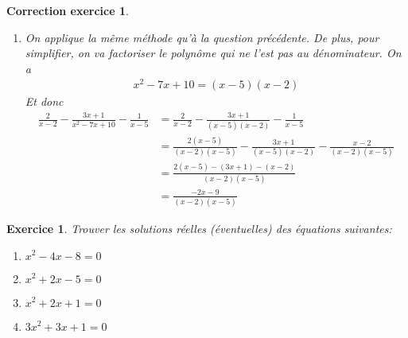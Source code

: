 \documentclass[12pt]{article}
\newtheorem{exercice}{\bf Exercice}
\newtheorem{correction}{\bf Correction exercice}
\newenvironment{exo}{
\begin{exercice}\smallskip\normalfont}{\end{exercice}
}
\newenvironment{cor}{
\begin{correction}\smallskip\normalfont}{\end{correction}
}
\newif\ifcorrige\corrigefalse
\begin{document}
\begin{cor}
\begin{enumerate}
\item On applique la m\^eme m\'ethode qu'\`a la question pr\'ec\'edente.
  De plus, pour simplifier, on va factoriser le polyn\^ome qui ne l'est pas au d\'enominateur.
  On a
  \begin{align*}
    x^2-7x+10 = (x-5)(x-2)
  \end{align*}
  Et donc
  \begin{align*}
    \frac{2}{x-2} - \frac{3x+1}{x^2-7x+10} - \frac{1}{x-5}
    &= \frac{2}{x-2} - \frac{3x+1}{(x-5)(x-2)} - \frac{1}{x-5}
    \\
    &= \frac{2(x-5)}{(x-2)(x-5)} - \frac{3x+1}{(x-5)(x-2)} - \frac{x-2}{(x-2)(x-5)}
    \\
    &= \frac{2(x-5) - (3x+1) - (x-2)}{(x-2)(x-5)}
    \\
    &= \frac{-2x - 9}{(x-2)(x-5)}
  \end{align*}
\end{enumerate}
\end{cor}
\color{black}
\fi



\begin{exo} Trouver les solutions r\'eelles (\'eventuelles) des \'equations suivantes:
\begin{multicols}{2}
\begin{enumerate}
\item $x^2 - 4x - 8 = 0$
\item $x^2 + 2x - 5 = 0$
\item $x^2 + 2x + 1 = 0$
\item $3x^2 + 3x + 1 = 0$
\end{enumerate}
\end{multicols}
\end{exo}

\ifcorrige
\color{magenta}
\begin{cor}
  $\qquad$
\begin{enumerate}
\item Les solutions de cette \'equation sont les racines r\'eelles du polyn\^ome.
  Le discriminant vaut $\Delta = 50 > 0$.
  Cette \'equation admet donc deux solutions r\'eelles
  $x_1 = \frac{4 - \sqrt{50}}{2} = \frac{4 - 5\sqrt{2}}{2}$
  et
  $x_2 = \frac{4 + \sqrt{50}}{2} = \frac{4 + 5\sqrt{2}}{2}$.
\item Le discriminant vaut $\Delta = 24 > 0$.
  L'\'equation admet donc deux solutions r\'eelles:
  $x_1 = \frac{-2 - \sqrt{24}}{2} = -1 - \sqrt{6}$
  et $x_2 = \frac{-2 + \sqrt{24}}{2} = -1 + \sqrt{6}$.
\item Dans ce cas, le discriminant vaut $\Delta = 0$.
  L'\'equation admet une unique solution r\'eelle : $x = -1$.
\item Dans ce cas, le discriminant vaut $\Delta = -3 < 0$
  et l'\'equation n'admet pas de solution r\'eelle.
\end{enumerate}
\end{cor}
\color{black}
\fi
\end{document}
